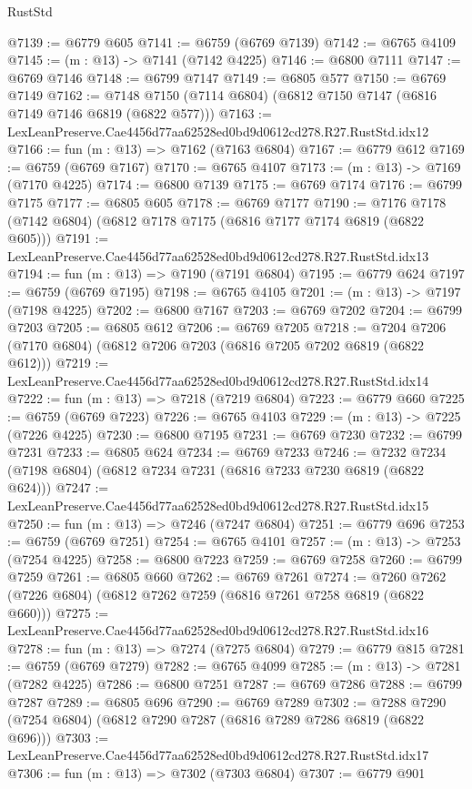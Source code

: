 \begin{lexlean}{RustStd}
\begin{coremodule}
@7139 := @6779 @605
@7141 := @6759 (@6769 @7139)
@7142 := @6765 @4109
@7145 := (m : @13) -> @7141 (@7142 @4225)
@7146 := @6800 @7111
@7147 := @6769 @7146
@7148 := @6799 @7147
@7149 := @6805 @577
@7150 := @6769 @7149
@7162 := @7148 @7150 (@7114 @6804) (@6812 @7150 @7147 (@6816 @7149 @7146 @6819 (@6822 @577)))
@7163 := LexLeanPreserve.Cae4456d77aa62528ed0bd9d0612cd278.R27.RustStd.idx12
@7166 := fun (m : @13) => @7162 (@7163 @6804)
@7167 := @6779 @612
@7169 := @6759 (@6769 @7167)
@7170 := @6765 @4107
@7173 := (m : @13) -> @7169 (@7170 @4225)
@7174 := @6800 @7139
@7175 := @6769 @7174
@7176 := @6799 @7175
@7177 := @6805 @605
@7178 := @6769 @7177
@7190 := @7176 @7178 (@7142 @6804) (@6812 @7178 @7175 (@6816 @7177 @7174 @6819 (@6822 @605)))
@7191 := LexLeanPreserve.Cae4456d77aa62528ed0bd9d0612cd278.R27.RustStd.idx13
@7194 := fun (m : @13) => @7190 (@7191 @6804)
@7195 := @6779 @624
@7197 := @6759 (@6769 @7195)
@7198 := @6765 @4105
@7201 := (m : @13) -> @7197 (@7198 @4225)
@7202 := @6800 @7167
@7203 := @6769 @7202
@7204 := @6799 @7203
@7205 := @6805 @612
@7206 := @6769 @7205
@7218 := @7204 @7206 (@7170 @6804) (@6812 @7206 @7203 (@6816 @7205 @7202 @6819 (@6822 @612)))
@7219 := LexLeanPreserve.Cae4456d77aa62528ed0bd9d0612cd278.R27.RustStd.idx14
@7222 := fun (m : @13) => @7218 (@7219 @6804)
@7223 := @6779 @660
@7225 := @6759 (@6769 @7223)
@7226 := @6765 @4103
@7229 := (m : @13) -> @7225 (@7226 @4225)
@7230 := @6800 @7195
@7231 := @6769 @7230
@7232 := @6799 @7231
@7233 := @6805 @624
@7234 := @6769 @7233
@7246 := @7232 @7234 (@7198 @6804) (@6812 @7234 @7231 (@6816 @7233 @7230 @6819 (@6822 @624)))
@7247 := LexLeanPreserve.Cae4456d77aa62528ed0bd9d0612cd278.R27.RustStd.idx15
@7250 := fun (m : @13) => @7246 (@7247 @6804)
@7251 := @6779 @696
@7253 := @6759 (@6769 @7251)
@7254 := @6765 @4101
@7257 := (m : @13) -> @7253 (@7254 @4225)
@7258 := @6800 @7223
@7259 := @6769 @7258
@7260 := @6799 @7259
@7261 := @6805 @660
@7262 := @6769 @7261
@7274 := @7260 @7262 (@7226 @6804) (@6812 @7262 @7259 (@6816 @7261 @7258 @6819 (@6822 @660)))
@7275 := LexLeanPreserve.Cae4456d77aa62528ed0bd9d0612cd278.R27.RustStd.idx16
@7278 := fun (m : @13) => @7274 (@7275 @6804)
@7279 := @6779 @815
@7281 := @6759 (@6769 @7279)
@7282 := @6765 @4099
@7285 := (m : @13) -> @7281 (@7282 @4225)
@7286 := @6800 @7251
@7287 := @6769 @7286
@7288 := @6799 @7287
@7289 := @6805 @696
@7290 := @6769 @7289
@7302 := @7288 @7290 (@7254 @6804) (@6812 @7290 @7287 (@6816 @7289 @7286 @6819 (@6822 @696)))
@7303 := LexLeanPreserve.Cae4456d77aa62528ed0bd9d0612cd278.R27.RustStd.idx17
@7306 := fun (m : @13) => @7302 (@7303 @6804)
@7307 := @6779 @901

\end{coremodule}
\end{lexlean}
